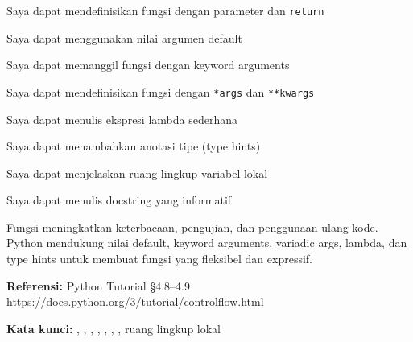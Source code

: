 ﻿\documentclass[../main.tex]{subfiles}
\begin{document}
\begin{checklist}
  \item Saya dapat mendefinisikan fungsi dengan parameter dan \texttt{return}
  \item Saya dapat menggunakan nilai argumen default
  \item Saya dapat memanggil fungsi dengan keyword arguments
  \item Saya dapat mendefinisikan fungsi dengan \texttt{*args} dan \texttt{**kwargs}
  \item Saya dapat menulis ekspresi lambda sederhana
  \item Saya dapat menambahkan anotasi tipe (type hints)
  \item Saya dapat menjelaskan ruang lingkup variabel lokal
  \item Saya dapat menulis docstring yang informatif
\end{checklist}

\begin{rangkuman}
Fungsi meningkatkan keterbacaan, pengujian, dan penggunaan ulang kode. Python mendukung nilai default, keyword arguments, variadic args, lambda, dan type hints untuk membuat fungsi yang fleksibel dan expressif.

\textbf{Referensi:} {\small Python Tutorial §4.8--4.9 \url{https://docs.python.org/3/tutorial/controlflow.html}}

\textbf{Kata kunci:} , , , , , , , ruang lingkup lokal
\end{rangkuman}
\end{document}
